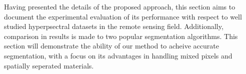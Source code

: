 Having presented the details of the proposed approach, this section aims to document the experimental evaluation of its performance with respect to well studied hyperpsectral datasets in the remote sensing field. Additionally, comparison in results is made to two popular segmentation algorithms. This section will demonstrate the ability of our method to acheive accurate segmentation, with a focus on its advantages in handling mixed pixels and spatially seperated materials.

